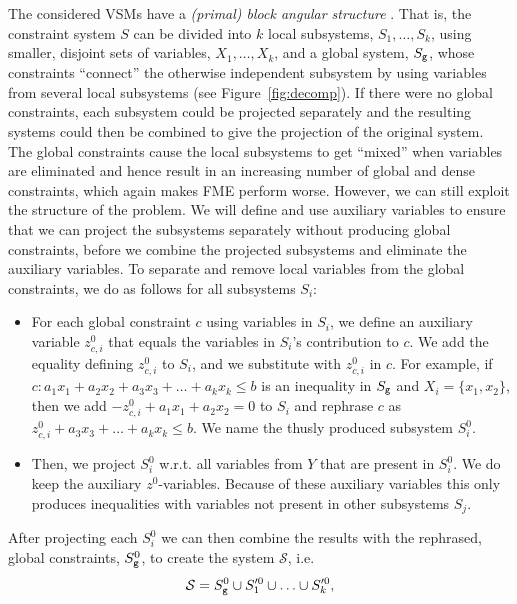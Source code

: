 The considered VSMs have a \emph{(primal) block angular structure} \cite{williams}. That is, the constraint system $S$ can be divided into $k$ local subsystems, $S_1, \ldots, S_k$, using smaller, disjoint sets of variables, $X_1, \ldots, X_k$, and a global system, $S_{\texttt{g}}$, whose constraints ``connect'' the otherwise independent subsystem by using variables from several local subsystems (see Figure~\ref{fig:decomp}). 
If there were no global constraints, each subsystem could be projected separately and the resulting systems could then be combined to give the projection of the original system. The global constraints cause the local subsystems to get ``mixed'' when variables are eliminated and hence result in an increasing number of global and dense constraints, which again makes FME perform worse. However, we can still exploit the structure of the problem. We will define and use auxiliary variables to ensure that we can project the subsystems separately without producing global constraints, before we combine the projected subsystems and eliminate the auxiliary variables. To separate and remove local variables from the global constraints, we do as follows for all subsystems $S_i$:
\begin{itemize}\itemsep0em
\item For each global constraint $c$ using variables in $S_i$, we define an auxiliary variable $z^0_{c,i}$ that equals the variables in $S_i$'s contribution to $c$. We add the equality defining $z^0_{c,i}$ to $S_i$, and we substitute with $z^0_{c,i}$ in $c$. For example, if $c: a_1x_1 + a_2x_2 + a_3x_3 + \ldots + a_kx_k \leq b$ is an inequality in $S_{\texttt{g}}$ and $X_i = \{x_1,x_2\}$, then we add $-z^0_{c,i} + a_1x_1 + a_2x_2 = 0$ to $S_i$ and rephrase $c$ as $z^0_{c,i} + a_3x_3 + \ldots + a_kx_k \leq b$. We name the thusly produced subsystem $S_i^0$. 

\item Then, we project $S_i^0$ w.r.t. all variables from $Y$ that are present in $S_i^0$. We do keep the auxiliary $z^0$-variables. 
Because of these auxiliary variables this only produces inequalities with variables not present in other subsystems $S_j$. 
\end{itemize}
After projecting each $S_i^0$ we can then combine the results with the rephrased, global constraints, $S_{\texttt{g}}^0$, to create the system $\mathcal{S}$, i.e. 
\begin{equation}\label{eq:curlyS}
\mathcal{S} = S^0_{\texttt{g}} \cup S'^0_1\cup \ldots \cup S'^0_k,
\end{equation}
